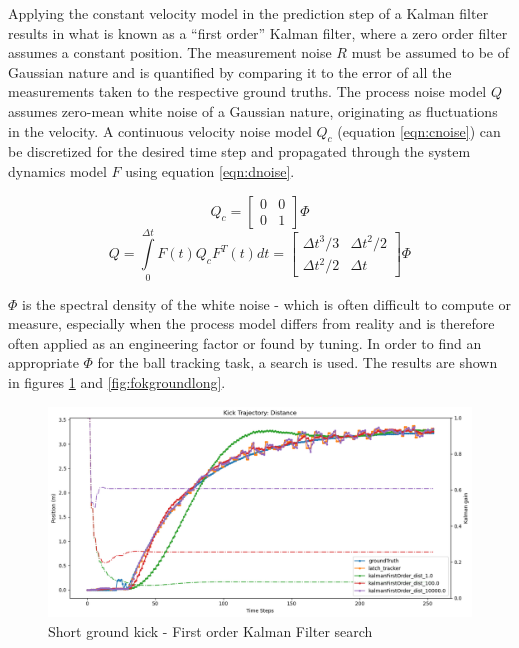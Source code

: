 \documentclass[a4paper,twoside,12pt]{report}
\begin{document}
Applying the constant velocity model in the prediction step of a Kalman filter results in what is known as a ``first order'' Kalman filter, where a zero order filter assumes a constant position. The measurement noise $R$ must be assumed to be of Gaussian nature and is quantified by comparing it to the error of all the measurements taken to the respective ground truths. The process noise model $Q$ assumes zero-mean white noise of a Gaussian nature, originating as fluctuations in the velocity. A continuous velocity noise model $Q_c$ (equation \ref{eqn:cnoise}) can be discretized for the desired time step and propagated through the system dynamics model $F$ using equation \ref{eqn:dnoise}. \citep{kalmanpy}

\begin{equation} 
Q_c
=
\begin{bmatrix}
    0 & 0 \\
    0 & 1 
\end{bmatrix}
\Phi
\label{eqn:cnoise}
\end{equation}
\begin{equation} 
Q = \int\limits_0^{\Delta t} F(t)Q_cF^T(t)dt
=
\begin{bmatrix}
    \Delta t^3/3 & \Delta t^2/2 \\
    \Delta t^2/2 & \Delta t 
\end{bmatrix}
\Phi
\label{eqn:dnoise}
\end{equation}

$\Phi$ is the spectral density of the white noise - which is often difficult to compute or measure, especially when the process model differs from reality and is therefore often applied as an engineering factor or found by tuning. In order to find an appropriate $\Phi$ for the ball tracking task, a search is used. The results are shown in figures \ref{fig:fokgroundshort} and \ref{fig:fokgroundlong}.

\begin{figure}[h!]
\begin{center}
\includegraphics[width=12cm]{images/fok_ground_short.png}
\caption{Short ground kick - First order Kalman Filter search}
\label{fig:fokgroundshort}
\end{center}
\end{figure}
\end{document}
